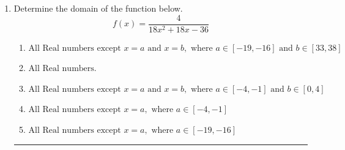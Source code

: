 \documentclass[14pt]{extbook}
\newcommand{\litem}[1]{\item#1\hspace*{-1cm}\rule{\textwidth}{0.4pt}}
\begin{document}
\begin{enumerate}
{\begin{enumerate}[label=\Alph*.]
\end{enumerate} }
\litem{
Determine the domain of the function below.\[ f(x) = \frac{4}{18x^{2} +18 x -36} \]\begin{enumerate}[label=\Alph*.]
\item \( \text{All Real numbers except } x = a \text{ and } x = b, \text{ where } a \in [-19, -16] \text{ and } b \in [33, 38] \)
\item \( \text{All Real numbers.} \)
\item \( \text{All Real numbers except } x = a \text{ and } x = b, \text{ where } a \in [-4, -1] \text{ and } b \in [0, 4] \)
\item \( \text{All Real numbers except } x = a, \text{ where } a \in [-4, -1] \)
\item \( \text{All Real numbers except } x = a, \text{ where } a \in [-19, -16] \)


\end{enumerate}}
\end{enumerate}
\end{document}
